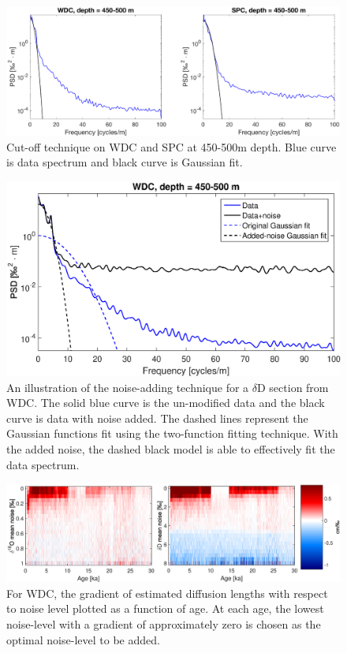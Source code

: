 \documentclass[draft, jgrga]{AGUTeX}
\begin{document}
\begin{figure}
	\includegraphics[width=\linewidth]{cutoff.eps}
	\caption{Cut-off technique on WDC and SPC at 450-500m depth. Blue curve is data spectrum and black curve is Gaussian fit.} \label{cutoff}
\end{figure}

\begin{figure}
	\includegraphics[width=.9\linewidth]{WAIS_spectrum_added_noise.eps}
	\caption{An illustration of the noise-adding technique for a $\delta$D section from WDC. The solid blue curve is the un-modified data and the black curve is data with noise added. The dashed lines represent the Gaussian functions fit using the two-function fitting technique. With the added noise, the dashed black model is able to effectively fit the data spectrum.} \label{WAIS_spectrum_added_noise}
\end{figure}

\begin{figure}
	\includegraphics[width=\linewidth]{added_noise_sensitivity.eps}
	\caption{For WDC, the gradient of estimated diffusion lengths with respect to noise level plotted as a function of age. At each age, the lowest noise-level with a gradient of approximately zero is chosen as the optimal noise-level to be added.} \label{added_noise_sensitivity}
\end{figure}
\end{document}
